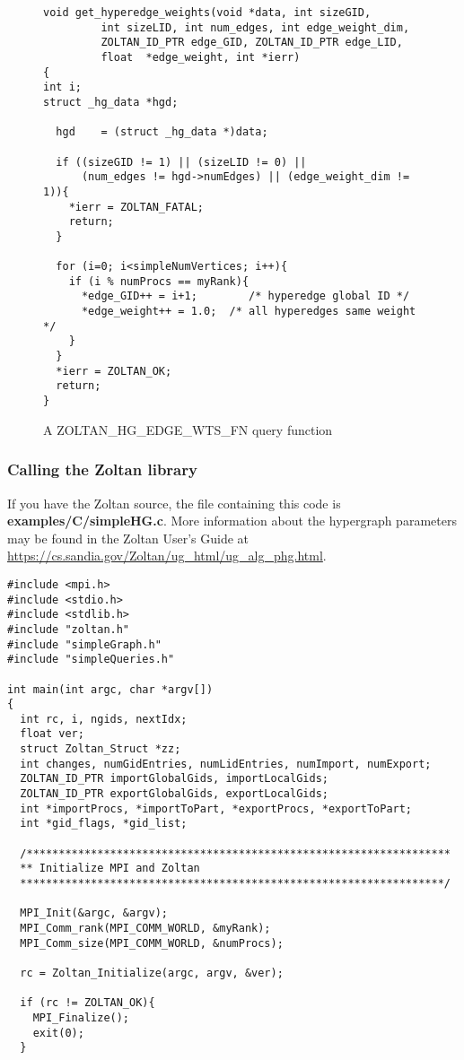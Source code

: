 \begin{figure}
\begin{flushleft}
\begin{verbatim}
void get_hyperedge_weights(void *data, int sizeGID,
         int sizeLID, int num_edges, int edge_weight_dim,
         ZOLTAN_ID_PTR edge_GID, ZOLTAN_ID_PTR edge_LID,
         float  *edge_weight, int *ierr)
{
int i;
struct _hg_data *hgd;

  hgd    = (struct _hg_data *)data;

  if ((sizeGID != 1) || (sizeLID != 0) ||
      (num_edges != hgd->numEdges) || (edge_weight_dim != 1)){
    *ierr = ZOLTAN_FATAL;
    return;
  }

  for (i=0; i<simpleNumVertices; i++){
    if (i % numProcs == myRank){
      *edge_GID++ = i+1;        /* hyperedge global ID */
      *edge_weight++ = 1.0;  /* all hyperedges same weight */
    }
  }
  *ierr = ZOLTAN_OK;
  return;
}
\end{verbatim}
\end{flushleft}
\caption{A ZOLTAN\_HG\_EDGE\_WTS\_FN query function}
\label{fig:EW}
\end{figure}

\clearpage
\subsubsection{Calling the Zoltan library}
If you have the Zoltan source, the file containing this
code is \textbf{examples/C/simpleHG.c}.
More information about the hypergraph parameters
may be found in the Zoltan User's Guide at
\url{https://cs.sandia.gov/Zoltan/ug_html/ug_alg_phg.html}.

\begin{flushleft}
\begin{verbatim}
#include <mpi.h>
#include <stdio.h>
#include <stdlib.h>
#include "zoltan.h"
#include "simpleGraph.h"
#include "simpleQueries.h"

int main(int argc, char *argv[])
{
  int rc, i, ngids, nextIdx;
  float ver;
  struct Zoltan_Struct *zz;
  int changes, numGidEntries, numLidEntries, numImport, numExport;
  ZOLTAN_ID_PTR importGlobalGids, importLocalGids;
  ZOLTAN_ID_PTR exportGlobalGids, exportLocalGids;
  int *importProcs, *importToPart, *exportProcs, *exportToPart;
  int *gid_flags, *gid_list;

  /******************************************************************
  ** Initialize MPI and Zoltan
  ******************************************************************/

  MPI_Init(&argc, &argv);
  MPI_Comm_rank(MPI_COMM_WORLD, &myRank);
  MPI_Comm_size(MPI_COMM_WORLD, &numProcs);

  rc = Zoltan_Initialize(argc, argv, &ver);

  if (rc != ZOLTAN_OK){
    MPI_Finalize();
    exit(0);
  }
\end{verbatim}
\end{flushleft}

